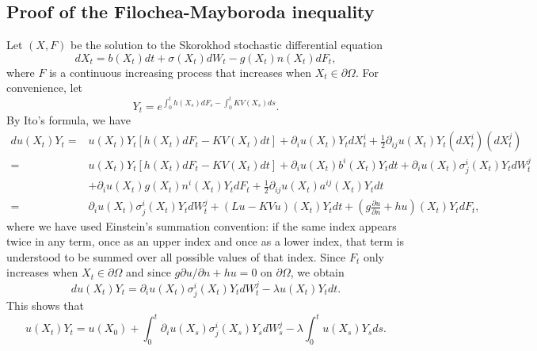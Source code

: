 \documentclass[a4paper,11pt]{article}
\begin{document}
\normalsize
\begin{appendices}

\section{Proof of the Filochea-Mayboroda inequality}\label{appA}

Let $(X, F)$ be the solution to the Skorokhod stochastic differential equation
\begin{equation*}
d X_t = b(X_t) dt + \sigma(X_t) d W_t - g(X_t) n(X_t) d F_t,
\end{equation*}
where $F$ is a continuous increasing process that increases when $X_t \in \partial \Omega$. For convenience, let
\begin{equation*}
Y_t = e^{\int_{0}^{t} h(X_s) d F_s - \int_{0}^{t} K V(X_s) ds}.
\end{equation*}
By Ito's formula, we have
\begin{equation*}
\begin{split}
du(X_t) Y_t = & u(X_t) Y_t [h(X_t) dF_t - K V(X_t) dt] + \partial_i u(X_t) Y_t dX^i_t + \frac{1}{2} \partial_{ij} u(X_t) Y_t (dX^i_t) (dX^j_t) \\
= & u(X_t) Y_t [h(X_t) dF_t - K V(X_t) dt] + \partial_i u(X_t) b^i(X_t) Y_t dt + \partial_i u(X_t) \sigma^i_j(X_t) Y_t dW^j_t \\
& + \partial_i u(X_t) g(X_t) n^i(X_t) Y_t dF_t + \frac{1}{2} \partial_{ij} u(X_t) a^{ij}(X_t) Y_t dt\\
= & \partial_i u(X_t) \sigma^i_j(X_t) Y_t dW^j_t + (L u - K V u) (X_t) Y_t dt
+\left( g \frac{\partial u}{\partial n} + h u \right) (X_t) Y_t dF_t,
\end{split}
\end{equation*}
where we have used Einstein's summation convention: if the same index appears twice in any term, once as an upper index and once as a lower index, that term is understood to be summed over all possible values of that index. Since $F_t$ only increases when $X_t \in \partial \Omega$ and since $g \partial u/\partial n + h u = 0$ on $\partial \Omega$, we obtain
\begin{equation*}
du(X_t) Y_t = \partial_i u(X_t) \sigma^i_j(X_t) Y_t dW^j_t - \lambda u(X_t) Y_tdt.
\end{equation*}
This shows that
\begin{equation*}
u(X_t)Y_t = u(X_0) + \int_0^t \partial_i u(X_s) \sigma^i_j(X_s) Y_s dW^j_s - \lambda \int_0^t u(X_s) Y_s ds.
\end{equation*}

\end{appendices}
\end{document}
